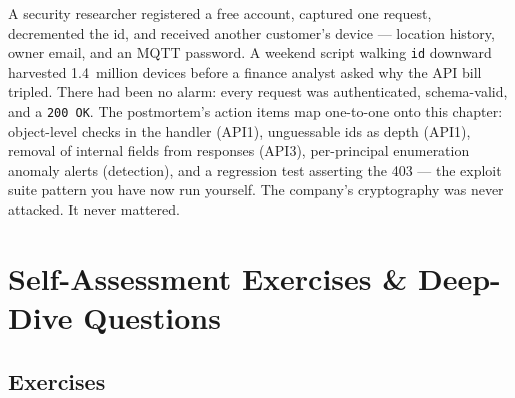 A security researcher registered a free account, captured one request,
decremented the id, and received another customer's device --- location
history, owner email, and an MQTT password. A weekend script walking
\texttt{id} downward harvested 1.4~million devices before a finance analyst
asked why the API bill tripled. There had been no alarm: every request was
authenticated, schema-valid, and a \texttt{200 OK}. The postmortem's
action items map one-to-one onto this chapter: object-level checks in the
handler (API1), unguessable ids as depth (API1), removal of internal fields
from responses (API3), per-principal enumeration anomaly alerts
(detection), and a regression test asserting the 403 --- the exploit suite
pattern you have now run yourself. The company's cryptography was never
attacked. It never mattered.

\section{Self-Assessment Exercises \& Deep-Dive Questions}
\label{sec:ch16-exercises}

\subsection*{Exercises}

